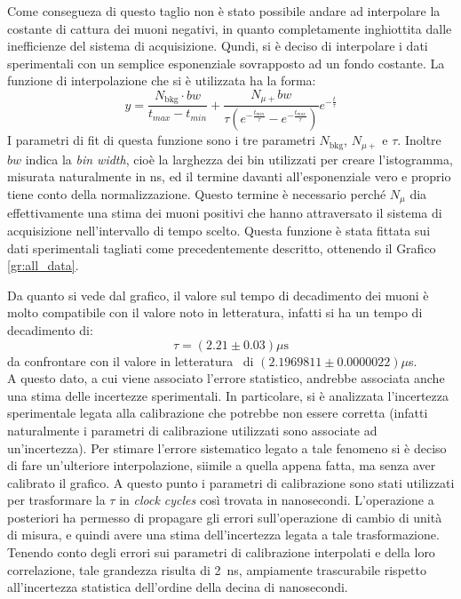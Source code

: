 Come consegueza di questo taglio non è stato possibile andare ad interpolare la costante di cattura dei muoni negativi, in quanto completamente inghiottita dalle inefficienze del sistema di acquisizione. Qundi, si è deciso di interpolare i dati sperimentali con un semplice esponenziale sovrapposto ad un fondo costante. La funzione di interpolazione che si è utilizzata ha la forma:
\begin{equation}
  y = \frac{N_\text{bkg} \cdot bw}{t_\textit{max}-t_\textit{min}}+\frac{N_{\mu+}bw}{\tau \left(e^{-\frac{t_\textit{min}}{\tau}} - e^{-\frac{t_\textit{max}}{\tau}}\right)}
  e^{-\frac{t}{\tau}} 
  \label{eq:fit_mean_life}
\end{equation}
I parametri di fit di questa funzione sono i tre parametri $N_\text{bkg}$, $N_{\mu+}$ e $\tau$. Inoltre $bw$ indica la \textit{bin width}, cioè la larghezza dei bin utilizzati per creare l'istogramma, misurata naturalmente in ns, ed il termine davanti all'esponenziale vero e proprio tiene conto della normalizzazione. Questo termine è necessario perché $N_\mu$ dia effettivamente una stima dei muoni positivi che hanno attraversato il sistema di acquisizione nell'intervallo di tempo scelto. Questa funzione è stata fittata sui dati sperimentali tagliati come precedentemente descritto, ottenendo il Grafico \ref{gr:all_data}.\\

Da quanto si vede dal grafico, il valore sul tempo di decadimento dei muoni è molto compatibile con il valore noto in  letteratura, infatti si ha un tempo di decadimento di:
\begin{equation}
  \tau = (2.21 \pm 0.03) \mu\text{s}
\end{equation}
da confrontare con il valore in letteratura~\cite{bib:Patrignani:2016xqp} di $(2.1969811 \pm 0.0000022) \mu$s.\\

A questo dato, a cui viene associato l'errore statistico, andrebbe associata anche una stima delle incertezze sperimentali. In particolare, si è analizzata l'incertezza sperimentale legata alla calibrazione che potrebbe non essere corretta (infatti naturalmente i parametri di calibrazione utilizzati sono associate ad un'incertezza). Per  stimare l'errore sistematico legato a tale fenomeno si è deciso di fare un'ulteriore interpolazione, siimile a quella appena fatta, ma senza aver calibrato il  grafico. A questo punto i parametri di calibrazione sono stati utilizzati per trasformare la $\tau$ in \textit{clock cycles} così trovata in nanosecondi. L'operazione a posteriori ha permesso di propagare gli errori sull'operazione di cambio di unità di misura, e quindi avere una stima dell'incertezza legata a tale trasformazione. Tenendo conto degli errori sui parametri di calibrazione interpolati e della loro correlazione, tale grandezza risulta di 2~ns, ampiamente trascurabile rispetto all'incertezza statistica dell'ordine della decina di nanosecondi.


